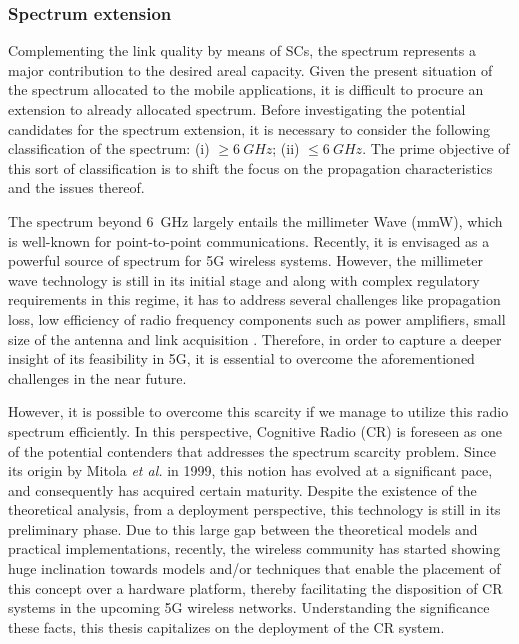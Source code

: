 \subsubsection*{Spectrum extension}
Complementing the link quality by means of SCs, the spectrum represents a major contribution to the desired areal capacity. Given the present situation of the spectrum allocated to the mobile applications, it is difficult to procure an extension to already allocated spectrum. Before investigating the potential candidates for the spectrum extension, it is necessary to consider the following classification of the spectrum:
(i) $\ge \SI{6}{GHz}$;
(ii) $\le \SI{6}{GHz}$.
The prime objective of this sort of classification is to shift the focus on the propagation characteristics and the issues thereof.


The spectrum beyond \SI{6}{GHz} largely entails the millimeter Wave (mmW), which is well-known for point-to-point communications. Recently, it is envisaged as a powerful source of spectrum for 5G wireless systems. However, the millimeter wave technology is still in its initial stage and along with complex regulatory requirements in this regime, it has to address several challenges like propagation loss, low efficiency of radio frequency components such as power amplifiers, small size of the antenna and link acquisition \cite{Rapp13}. Therefore, in order to capture a deeper insight of its feasibility in 5G, it is essential to overcome the aforementioned challenges in the near future.

 However, it is possible to overcome this scarcity if we manage to utilize this radio spectrum efficiently. In this perspective, Cognitive Radio (CR) is foreseen as one of the potential contenders that addresses the spectrum scarcity problem. Since its origin by Mitola \textit{et al.} in 1999, this notion has evolved at a significant pace, and consequently has acquired certain maturity. Despite the existence of the theoretical analysis, from a deployment perspective, this technology is still in its preliminary phase. Due to this large gap between the theoretical models and practical implementations, recently, the wireless community has started showing huge inclination towards models and/or techniques that enable the placement of this concept over a hardware platform, thereby facilitating the disposition of CR systems in the upcoming 5G wireless networks. Understanding the significance these facts, this thesis capitalizes on the deployment of the CR system. 


